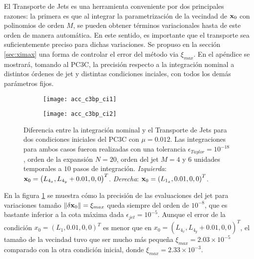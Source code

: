 El Transporte de Jets es una herramienta conveniente por dos principales razones: la primera es que al integrar la parametrización de la vecindad de $\mathbf{x}_0$ con polinomios de orden $M$, se pueden obtener términos variacionales hasta de este orden de manera automática. En este sentido, es importante que el transporte sea suficientemente preciso para dichas variaciones. Se propuso en la sección \ref{sec:ximax} una forma de controlar el error del método via $\xi_{max}$. En el apéndice se mostrará, tomando al PC3C, la precisión respecto a la integración nominal a distintos órdenes de jet y distintas condiciones inciales, con todos los demás parámetros fijos. 

\begin{figure}[h!]
\centering
\begin{subfigure}{0.49\textwidth}
	\centering
	\texttt{[image: acc\_c3bp\_ci1]}
\end{subfigure}
%
\begin{subfigure}{0.49\textwidth}
	\centering
	\texttt{[image: acc\_c3bp\_ci2]}
\end{subfigure}
\caption{Diferencia entre la integración nominal y el Transporte de Jets para dos condiciones iniciales del PC3C con $\mu = 0.012$. Las integraciones para ambos casos fueron realizadas con una tolerancia $\epsilon_{Taylor} = 10^{-18}$, orden de la expansión $N=20$, orden del jet $M=4$ y $6$ unidades temporales a $10$ pasos de integración. \textit{Izquierda}: $\mathbf{x}_0 =\left(L_{4_x}, L_{4_y} + 0.01, 0, 0 \right)^T$. \textit{Derecha}: $\mathbf{x}_0 = \left(L_{1_x}, 0.01, 0, 0 \right)^T$.}
\label{fig:acc_ci}
\end{figure}

En la figura \ref{fig:acc_ci} se muestra cómo la precisión de las evaluaciones del jet para variaciones tamaño $\left\lVert\delta \mathbf{x}_0\right\rVert = \xi_{max}$ queda siempre del orden de $10^{-8}$, que es bastante inferior a la cota máxima dada $\epsilon_{jet} = 10^{-5}$. Aunque el error de la condición $x_0 = (L_{1}, 0.01, 0,0)^T$ es menor que en $x_0 = (L_{4_x}, L_{4_y} + 0.01, 0,0)^T$, el tamaño de la vecindad tuvo que ser mucho más pequeña $\xi_{max} = 2.03 \times 10^{-5}$ comparado con la otra condición inicial, donde $\xi_{max} = 2.33 \times 10^{-3}$. 

